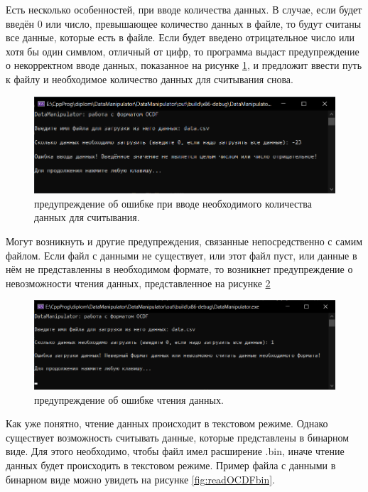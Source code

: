 {  \par Есть несколько особенностей, при вводе количества данных. В случае, если будет введён 0 или число, превышающее количество данных в файле, то будут считаны все данные, которые есть в файле. Если будет введено отрицательное число или хотя бы один симвлом, отличный от цифр, то программа выдаст предупреждение о некорректном вводе данных, показанное на рисунке \ref{fig:readOCDFerror1}, и предложит ввести путь к файлу и необходимое количество данных для считывания снова. 

  \begin{figure}[H]
    \centering
    \includegraphics[width=\textwidth]{images/readOCDFerror1.png}
    \caption{предупреждение об ошибке при вводе необходимого количества данных для считывания.} 
    \label{fig:readOCDFerror1}
  \end{figure}

  \par Могут возникнуть и другие предупреждения, связанные непосредственно с самим файлом. Если файл с данными не существует, или этот файл пуст, или данные в нём не представленны в необходимом формате, то возникнет предупреждение о невозможности чтения данных, представленное на рисунке \ref{fig:readOCDFerror2}

  \begin{figure}[H]
    \centering
    \includegraphics[width=\textwidth]{images/readOCDFerror2.png}
    \caption{предупреждение об ошибке чтения данных.} 
    \label{fig:readOCDFerror2}
  \end{figure}

  \par Как уже понятно, чтение данных происходит в текстовом режиме. Однако существует возможность считывать данные, которые представлены в бинарном виде. Для этого необходимо, чтобы файл имел расширение .bin, иначе чтение данных будет происходить в текстовом режиме. Пример файла с данными в бинарном виде можно увидеть на рисунке \ref{fig:readOCDFbin}.

}

